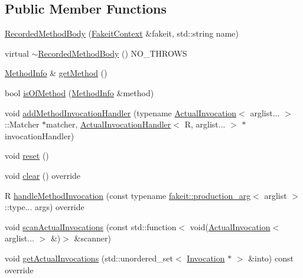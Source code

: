 \subsection*{Public Member Functions}
\begin{DoxyCompactItemize}
\item 
\mbox{\hyperlink{classfakeit_1_1RecordedMethodBody_af3668148275c0c7d1e22880218314eea}{Recorded\+Method\+Body}} (\mbox{\hyperlink{structfakeit_1_1FakeitContext}{Fakeit\+Context}} \&fakeit, std\+::string name)
\item 
virtual \mbox{\hyperlink{classfakeit_1_1RecordedMethodBody_a1afe57f937f8c6161774ae762f36b6d0}{$\sim$\+Recorded\+Method\+Body}} () N\+O\+\_\+\+T\+H\+R\+O\+WS
\item 
\mbox{\hyperlink{structfakeit_1_1MethodInfo}{Method\+Info}} \& \mbox{\hyperlink{classfakeit_1_1RecordedMethodBody_a12e45d3948ebf9e8b3e16f704fd16503}{get\+Method}} ()
\item 
bool \mbox{\hyperlink{classfakeit_1_1RecordedMethodBody_ac83a9eb22dedef9e10f3494198b5e3e1}{is\+Of\+Method}} (\mbox{\hyperlink{structfakeit_1_1MethodInfo}{Method\+Info}} \&method)
\item 
void \mbox{\hyperlink{classfakeit_1_1RecordedMethodBody_a41c27f1eafd04235bb736c2f60b636fa}{add\+Method\+Invocation\+Handler}} (typename \mbox{\hyperlink{structfakeit_1_1ActualInvocation}{Actual\+Invocation}}$<$ arglist... $>$\+::Matcher $\ast$matcher, \mbox{\hyperlink{structfakeit_1_1ActualInvocationHandler}{Actual\+Invocation\+Handler}}$<$ R, arglist... $>$ $\ast$invocation\+Handler)
\item 
void \mbox{\hyperlink{classfakeit_1_1RecordedMethodBody_a24512687527253aa107d707e053d1d2e}{reset}} ()
\item 
void \mbox{\hyperlink{classfakeit_1_1RecordedMethodBody_a6164a16c7813da2b7cd0d46568f1f1bc}{clear}} () override
\item 
R \mbox{\hyperlink{classfakeit_1_1RecordedMethodBody_a7ba17fdfe96f573c1d3992433a50d170}{handle\+Method\+Invocation}} (const typename \mbox{\hyperlink{structfakeit_1_1production__arg}{fakeit\+::production\+\_\+arg}}$<$ arglist $>$\+::type... args) override
\item 
void \mbox{\hyperlink{classfakeit_1_1RecordedMethodBody_a85b87e7396b4cc8536b384302826bae3}{scan\+Actual\+Invocations}} (const std\+::function$<$ void(\mbox{\hyperlink{structfakeit_1_1ActualInvocation}{Actual\+Invocation}}$<$ arglist... $>$ \&)$>$ \&scanner)
\item 
void \mbox{\hyperlink{classfakeit_1_1RecordedMethodBody_a72f16057f5f4b556f31237986116a094}{get\+Actual\+Invocations}} (std\+::unordered\+\_\+set$<$ \mbox{\hyperlink{structfakeit_1_1Invocation}{Invocation}} $\ast$ $>$ \&into) const override

\end{DoxyCompactItemize}

